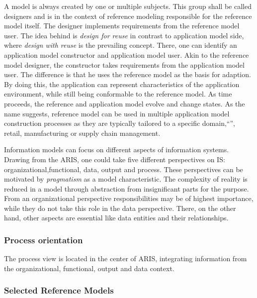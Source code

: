 		  
		A model is always created by one or multiple subjects. This group shall be called designers and is in the context of reference modeling responsible for the reference model itself. The designer implements requirements from the reference model user. The idea behind is \textit{design for reuse} in contrast to application model side, where \textit{design with reuse} is the prevailing concept. There, one can identify an application model constructor and application model user. Akin to the reference model designer, the constructor takes requirements from the application model user. The difference is that he uses the reference model as the basis for adaption. By doing this, the application can represent characteristics of the application environment, while still being conformable to the reference model. As time proceeds, the reference and application model evolve and change states. As the name suggests, reference model can be used in multiple application model construction processes as they are typically tailored to a specific domain,\enquote{\eg}, retail, manufacturing or supply chain management.
		
		
		
		Information models can focus on different aspects of information systems. Drawing from the  \acrfull{ARIS}, one could take five different perspectives on \acrshort{IS}: organizational,functional, data, output and process. These perspectives can be motivated by \textit{pragmatism} as a model characteristic. The complexity of reality is reduced in a model through abstraction from insignificant parts for the purpose. From an organizational perspective responsibilities may be of highest importance, while they do not take this role in the data perspective. There, on the other hand, other aspects are essential like data entities and their relationships. 
		
		
		\subsubsection{Process orientation}
		 The process view is located in the center of \acrshort{ARIS}, integrating information from the organizational, functional, output and data context. 
				
	
		
		\subsubsection{Selected Reference Models}
		
